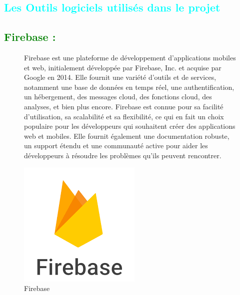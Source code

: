 \begin{flushleft}
	\section{\textcolor{cyan}{Les Outils logiciels utilisés dans le projet}}
	\subsection{\textcolor{green}{Firebase :}}
	\begin{figure}[h]
		\begin{minipage}{0.6\textwidth}
			Firebase est une plateforme de développement d'applications mobiles et web, initialement développée par Firebase, Inc. et acquise par Google en 2014. Elle fournit une variété d'outils et de services, notamment une base de données en temps réel, une authentification, un hébergement, des messages cloud, des fonctions cloud, des analyses, et bien plus encore. Firebase est connue pour sa facilité d'utilisation, sa scalabilité et sa flexibilité, ce qui en fait un choix populaire pour les développeurs qui souhaitent créer des applications web et mobiles. Elle fournit également une documentation robuste, un support étendu et une communauté active pour aider les développeurs à résoudre les problèmes qu'ils peuvent rencontrer.
		\end{minipage}
		\begin{minipage}{0.4\textwidth}
			\centering
			\includegraphics[width=\textwidth]{chapitres/images/firebase.png}
			\caption{Firebase}
			\label{fig:votre_image}
		\end{minipage}
	\end{figure}

\end{flushleft}
